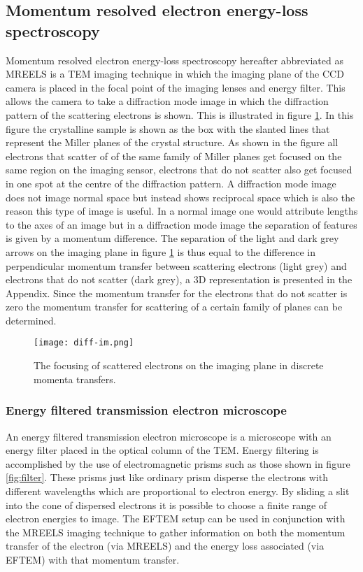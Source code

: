 \subsection{Momentum resolved electron energy-loss spectroscopy}
\label{sec:MREELS}
Momentum resolved electron energy-loss spectroscopy hereafter abbreviated as MREELS is a TEM imaging technique in which the imaging plane of the CCD camera is placed in the focal point of the imaging lenses and energy filter.
This allows the camera to take a diffraction mode image in which the diffraction pattern of the scattering electrons is shown. This is illustrated in figure \ref{fig:diff-im}. In this figure the crystalline sample is shown as the box with the slanted lines that represent the Miller planes of the crystal structure.
As shown in the figure all electrons that scatter of of the same family of Miller planes get focused on the same region on the imaging sensor, electrons that do not scatter also get focused in one spot at the centre of the diffraction pattern.
A diffraction mode image does not image normal space but instead shows reciprocal space which is also the reason this type of image is useful. In a normal image one would attribute lengths to the axes of an image but in a diffraction mode image the separation of features is given by a momentum difference.
The separation of the light and dark grey arrows on the imaging plane in figure \ref{fig:diff-im} is thus equal to the difference in perpendicular momentum transfer between scattering electrons (light grey) and electrons that do not scatter (dark grey), a 3D representation is presented in the Appendix.
Since the momentum transfer for the electrons that do not scatter is zero the momentum transfer for scattering of a certain family of planes can be determined.

\begin{figure}
	\centering
	\texttt{[image: diff-im.png]}
	\caption{The focusing of scattered electrons on the imaging plane in discrete momenta transfers.}
	\label{fig:diff-im}
\end{figure}

\subsubsection{Energy filtered transmission electron microscope}
\label{sec:eftem}
An energy filtered transmission electron microscope is a microscope with an energy filter placed in the optical column of the TEM. Energy filtering is accomplished by the use of electromagnetic prisms such as those shown in figure \ref{fig:filter}.
These prisms just like ordinary prism disperse the electrons with different wavelengths which are proportional to electron energy. By sliding a slit into the cone of dispersed electrons it is possible to choose a finite range of electron energies to image.
The EFTEM setup can be used in conjunction with the MREELS imaging technique to gather information on both the momentum transfer of the electron (via MREELS) and the energy loss associated (via EFTEM) with that momentum transfer.

